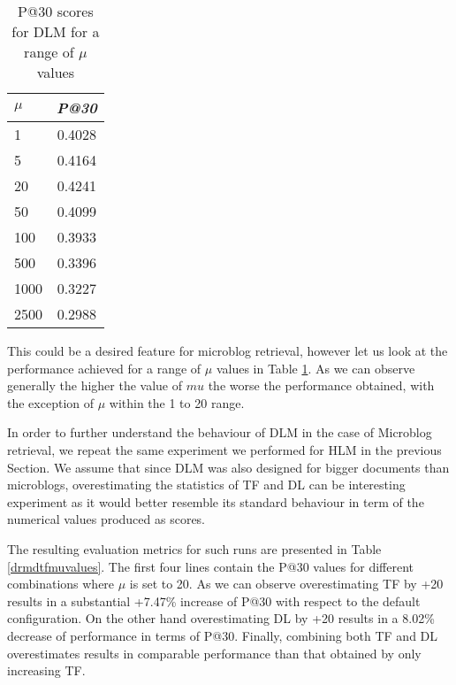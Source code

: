 \begin{table}[]

	\caption{P@30 scores for DLM for a range of $\mu$ values}
	\centering
	\begin{tabular}{l|c} 	
	\textit{\textbf{$\mu$}} & 
	\textit{\textbf{P@30}} 	
	\tabularnewline
	\hline
	1 & 0.4028 \\
	5 &  0.4164 \\
	20 & 0.4241 \\
	50 &  0.4099 \\
	100 &  0.3933 \\
	500 &  0.3396 \\
	1000 & 0.3227 \\
	2500 & 0.2988 \\
	\hline	
	\end{tabular}
	\label{drmmuvalues}
\end{table}

This could be a desired feature for microblog retrieval, however let us look at the performance achieved for a range of $\mu$ values in Table \ref{drmmuvalues}. As we can observe generally the higher the value of $mu$ the worse the performance obtained, with the exception of $\mu$ within the 1 to 20 range. 

In order to further understand the behaviour of DLM in the case of Microblog retrieval, we repeat the same experiment we performed for HLM in the previous Section. We assume that since DLM was also designed for bigger documents than microblogs, overestimating the statistics of TF and DL can be interesting experiment as it would better resemble its standard behaviour in term of the numerical values produced as scores. 

The resulting evaluation metrics for such runs are presented in Table \ref{drmdtfmuvalues}. The first four lines contain the P@30 values for different combinations where $\mu$ is set to 20. As we can observe overestimating TF by +20 results in a substantial +7.47\% increase of P@30 with respect to the default configuration. On the other hand overestimating DL by +20 results in a 8.02\% decrease of performance in terms of P@30. Finally, combining both TF and DL overestimates results in comparable performance than that obtained by only increasing TF.

